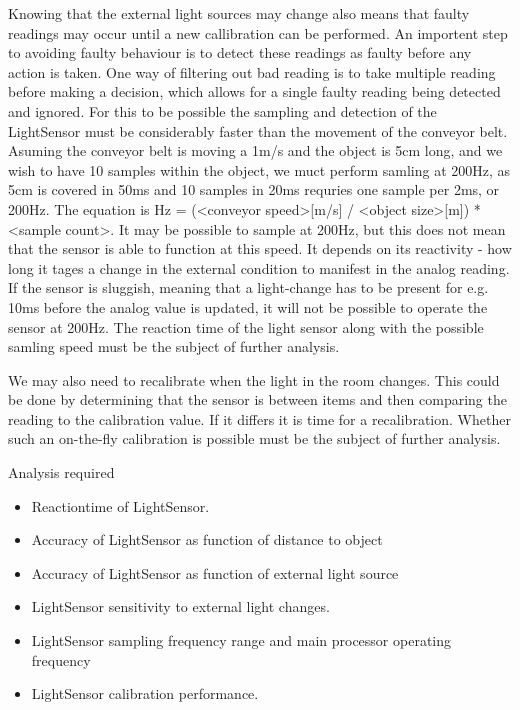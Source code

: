 \documentclass[11pt,a4]{article}
\begin{document}
Knowing that the external light sources may change also means that faulty readings may occur until a new callibration can be performed. An importent step to avoiding faulty behaviour is to detect these readings as faulty before any action is taken. One way of filtering out bad reading is to take multiple reading before making a decision, which allows for a single faulty reading being detected and ignored. For this to be possible the sampling and detection of the LightSensor must be considerably faster than the movement of the conveyor belt. Asuming the conveyor belt is moving a 1m/s and the object is 5cm long, and we wish to have 10 samples within the object, we muct perform samling at 200Hz, as 5cm is covered in 50ms and 10 samples in 20ms requries one sample per 2ms, or 200Hz. The equation is Hz = (<conveyor speed>[m/s] / <object size>[m]) * <sample count>. It may be possible to sample at 200Hz, but this does not mean that the sensor is able to function at this speed. It depends on its reactivity - how long it tages a change in the external condition to manifest in the analog reading. If the sensor is sluggish, meaning that a light-change has to be present for e.g. 10ms before the analog value is updated, it will not be possible to operate the sensor at 200Hz. The reaction time of the light sensor along with the possible samling speed must be the subject of further analysis.

We may also need to recalibrate when the light in the room changes. This could be done by determining that the sensor is between items and then comparing the reading to the calibration value. If it differs it is time for a recalibration. Whether such an on-the-fly calibration is possible must be the subject of further analysis.

\noindent Analysis required
\begin{itemize}
    \item Reactiontime of LightSensor.
    \item Accuracy of LightSensor as function of distance to object
    \item Accuracy of LightSensor as function of external light source
    \item LightSensor sensitivity to external light changes.
    \item LightSensor sampling frequency range and main processor operating frequency
    \item LightSensor calibration performance.
\end{itemize}
\end{document}
